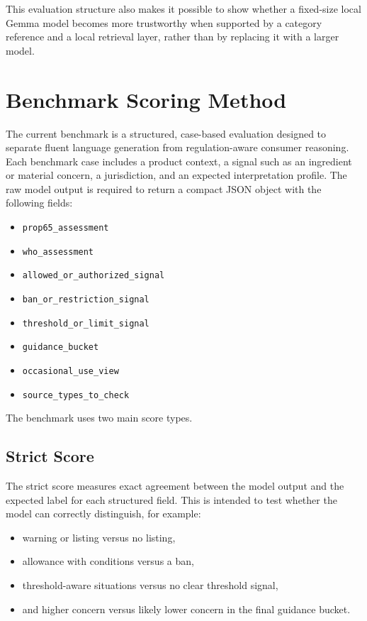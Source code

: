 \documentclass[11pt]{article}
\begin{document}
This evaluation structure also makes it possible to show whether a fixed-size local Gemma model becomes more trustworthy when supported by a category reference and a local retrieval layer, rather than by replacing it with a larger model.

\section{Benchmark Scoring Method}

The current benchmark is a structured, case-based evaluation designed to separate fluent language generation from regulation-aware consumer reasoning. Each benchmark case includes a product context, a signal such as an ingredient or material concern, a jurisdiction, and an expected interpretation profile. The raw model output is required to return a compact JSON object with the following fields:

\begin{itemize}[leftmargin=1.5em]
\item \texttt{prop65\_assessment}
\item \texttt{who\_assessment}
\item \texttt{allowed\_or\_authorized\_signal}
\item \texttt{ban\_or\_restriction\_signal}
\item \texttt{threshold\_or\_limit\_signal}
\item \texttt{guidance\_bucket}
\item \texttt{occasional\_use\_view}
\item \texttt{source\_types\_to\_check}
\end{itemize}

The benchmark uses two main score types.

\subsection{Strict Score}

The strict score measures exact agreement between the model output and the expected label for each structured field. This is intended to test whether the model can correctly distinguish, for example:

\begin{itemize}[leftmargin=1.5em]
\item warning or listing versus no listing,
\item allowance with conditions versus a ban,
\item threshold-aware situations versus no clear threshold signal,
\item and higher concern versus likely lower concern in the final guidance bucket.
\end{itemize}
\end{document}
